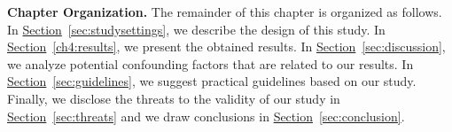 %
%
%
%
%

\noindent \textbf{Chapter Organization.} The remainder of this chapter is
organized as follows. In
\hyperref[sec:studysettings]{Section}~\ref{sec:studysettings}, we describe the
design of this study. In \hyperref[ch4:results]{Section}~\ref{ch4:results}, we
present the obtained results. In
\hyperref[sec:discussion]{Section}~\ref{sec:discussion}, we analyze potential
confounding factors that are related to our results. In
\hyperref[sec:guidelines]{Section}~\ref{sec:guidelines}, we suggest practical
guidelines based on our study. Finally, we disclose the threats to the validity
of our study in \hyperref[sec:threats]{Section}~\ref{sec:threats} and we draw
conclusions in \hyperref[sec:conclusion]{Section}~\ref{sec:conclusion}. 

